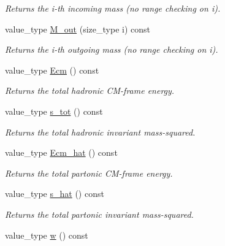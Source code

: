 \begin{DoxyCompactItemize}
\begin{DoxyCompactList}\small\item\em Returns the i-\/th incoming mass (no range checking on i). \end{DoxyCompactList}\item 
\hypertarget{a00441_a959183c12a67b2e4428b5257b7c13ebf}{value\-\_\-type \hyperlink{a00441_a959183c12a67b2e4428b5257b7c13ebf}{M\-\_\-out} (size\-\_\-type i) const }\label{a00441_a959183c12a67b2e4428b5257b7c13ebf}

\begin{DoxyCompactList}\small\item\em Returns the i-\/th outgoing mass (no range checking on i). \end{DoxyCompactList}\item 
\hypertarget{a00441_ad2cd771c9367fc65df19d5b2ecdc408b}{value\-\_\-type \hyperlink{a00441_ad2cd771c9367fc65df19d5b2ecdc408b}{Ecm} () const }\label{a00441_ad2cd771c9367fc65df19d5b2ecdc408b}

\begin{DoxyCompactList}\small\item\em Returns the total hadronic C\-M-\/frame energy. \end{DoxyCompactList}\item 
\hypertarget{a00441_a537a3b843c6f344767b390af3c3d2c2e}{value\-\_\-type \hyperlink{a00441_a537a3b843c6f344767b390af3c3d2c2e}{s\-\_\-tot} () const }\label{a00441_a537a3b843c6f344767b390af3c3d2c2e}

\begin{DoxyCompactList}\small\item\em Returns the total hadronic invariant mass-\/squared. \end{DoxyCompactList}\item 
\hypertarget{a00441_a19143c958a21b0c29eabfdabb086181a}{value\-\_\-type \hyperlink{a00441_a19143c958a21b0c29eabfdabb086181a}{Ecm\-\_\-hat} () const }\label{a00441_a19143c958a21b0c29eabfdabb086181a}

\begin{DoxyCompactList}\small\item\em Returns the total partonic C\-M-\/frame energy. \end{DoxyCompactList}\item 
\hypertarget{a00441_aefbfe8858098c6dabea063631f206864}{value\-\_\-type \hyperlink{a00441_aefbfe8858098c6dabea063631f206864}{s\-\_\-hat} () const }\label{a00441_aefbfe8858098c6dabea063631f206864}

\begin{DoxyCompactList}\small\item\em Returns the total partonic invariant mass-\/squared. \end{DoxyCompactList}\item 
\hypertarget{a00441_a7129e1370ce585ae74defff94878d680}{value\-\_\-type \hyperlink{a00441_a7129e1370ce585ae74defff94878d680}{w} () const }\label{a00441_a7129e1370ce585ae74defff94878d680}


\end{DoxyCompactItemize}
